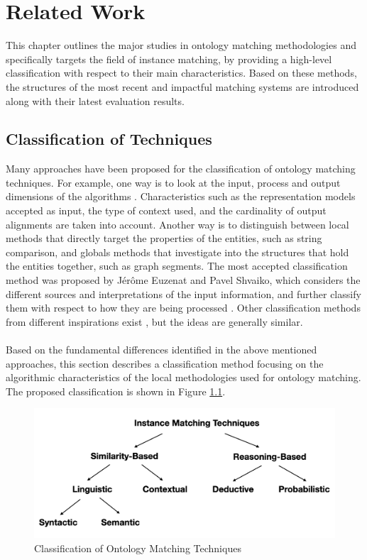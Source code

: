 \chapter{Related Work}

This chapter outlines the major studies in ontology matching methodologies and specifically targets the field of instance matching, by providing a high-level classification with respect to their main characteristics. Based on these methods, the structures of the most recent and impactful matching systems are introduced along with their latest evaluation results.


\section{Classification of Techniques}

Many approaches have been proposed for the classification of ontology matching techniques. For example, one way is to look at the input, process and output dimensions of the algorithms \cite{euzenat2013d}. Characteristics such as the representation models accepted as input, the type of context used, and the cardinality of output alignments are taken into account. Another way is to distinguish between local methods that directly target the properties of the entities, such as string comparison, and globals methods that investigate into the structures that hold the entities together, such as graph segments. The most accepted classification method was proposed by Jérôme Euzenat and Pavel Shvaiko, which considers the different sources and interpretations of the input information, and further classify them with respect to how they are being processed \cite{euzenat2013d}. Other classification methods from different inspirations exist \cite{DBLP:conf/swb/Ehrig2007,DBLP:conf/icde/MadhavanBDH05}, but the ideas are generally similar.
\\\\
Based on the fundamental differences identified in the above mentioned approaches, this section describes a classification method focusing on the algorithmic characteristics of the local methodologies used for ontology matching. The proposed classification is shown in Figure \ref{fig:techniques}.

\begin{figure}[ht]
\includegraphics[width=\textwidth]{img/ontology_matching_classification.png}
\caption{Classification of Ontology Matching Techniques}
\label{fig:techniques}
\end{figure}

